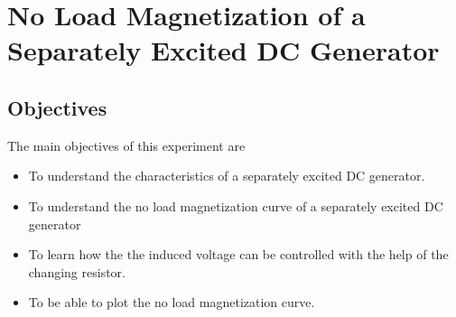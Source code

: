 

\chapter{No Load Magnetization of a Separately Excited DC Generator}
\label{exp2}


\section{Objectives}
The main objectives of this experiment are
\begin{itemize}
    \item To understand the characteristics of a separately excited DC generator.
    \item To understand the no load magnetization curve of a separately excited DC generator
    \item To learn how the the induced voltage can be controlled with the help of the changing resistor.
    \item To be able to plot the no load magnetization curve.
\end{itemize}


